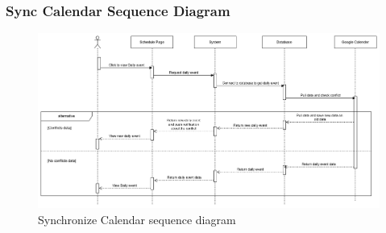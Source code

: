 \subsubsection{Sync Calendar Sequence Diagram}
\begin{figure}[H]
    \centering
    \includegraphics[width=1\textwidth, height=0.3\textheight]{image/SyncCalendar.png} 
    \caption{Synchronize Calendar sequence diagram}
    \label{fig:sync_calendar_sequence}
\end{figure}


